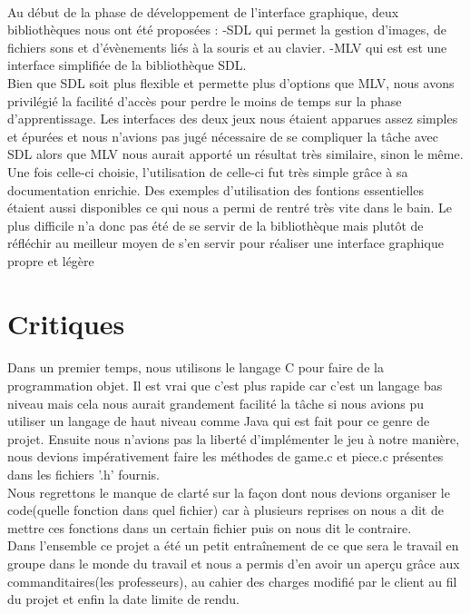 \documentclass[20pt]{article}
\begin{document}
\paragraph{}
Au début de la phase de développement de l'interface graphique, deux bibliothèques nous ont été proposées : 
-SDL qui permet la gestion d'images, de fichiers sons et d'évènements liés à la souris et au clavier.
-MLV qui est est une interface simplifiée de la bibliothèque SDL.\\
Bien que SDL soit plus flexible et permette plus d'options que MLV, nous avons privilégié la facilité d'accès pour perdre le moins de temps sur la phase d'apprentissage. Les interfaces des deux jeux nous étaient apparues assez simples et épurées et nous n'avions pas jugé nécessaire de se compliquer la tâche avec SDL alors que MLV nous aurait apporté un résultat très similaire, sinon le même.
Une fois celle-ci choisie, l'utilisation de celle-ci fut très simple grâce à sa documentation enrichie. Des exemples d'utilisation des fontions essentielles étaient aussi disponibles ce qui nous a permi de rentré très vite dans le bain. Le plus difficile n'a donc pas été de se servir de la bibliothèque mais  plutôt de réfléchir au meilleur moyen de s'en servir pour réaliser une interface graphique propre et légère

\newpage

\section{Critiques}
\paragraph{}
Dans un premier temps, nous utilisons le langage C pour faire de la programmation objet. Il est vrai que c'est plus rapide car c'est un langage bas niveau mais cela nous aurait grandement facilité la tâche si nous avions pu utiliser un langage de haut niveau comme Java qui est fait pour ce genre de projet. Ensuite nous n'avions pas la liberté d'implémenter le jeu à notre manière, nous devions impérativement faire les méthodes de game.c et piece.c présentes dans les fichiers '.h' fournis.\\
Nous regrettons le manque de clarté sur la façon dont nous devions organiser le code(quelle fonction dans quel fichier) car à plusieurs reprises on nous a dit de mettre ces fonctions dans un certain fichier puis on nous dit le contraire.\\
Dans l'ensemble ce projet a été un petit entraînement de ce que sera le travail en groupe dans le monde du travail et nous a permis d'en avoir un aperçu grâce aux commanditaires(les professeurs), au cahier des charges modifié par le client au fil du projet et enfin la date limite de rendu.
\end{document}
